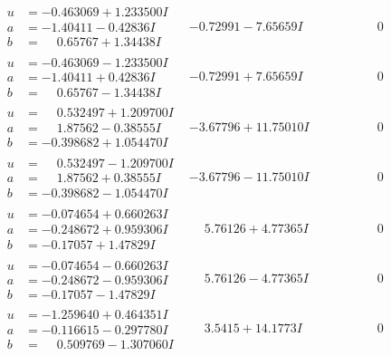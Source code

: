\documentclass[1p]{elsarticle_modified}
\theoremstyle{definition}
\begin{document}
$$\begin{array}{c|c|c}
\begin{aligned}
u &= -0.463069 + 1.233500 I \\
a &= -1.40411 - 0.42836 I \\
b &= \phantom{-}0.65767 + 1.34438 I\end{aligned}
 & -0.72991 - 7.65659 I & \phantom{-0.000000 } 0 \\ \hline\begin{aligned}
u &= -0.463069 - 1.233500 I \\
a &= -1.40411 + 0.42836 I \\
b &= \phantom{-}0.65767 - 1.34438 I\end{aligned}
 & -0.72991 + 7.65659 I & \phantom{-0.000000 } 0 \\ \hline\begin{aligned}
u &= \phantom{-}0.532497 + 1.209700 I \\
a &= \phantom{-}1.87562 - 0.38555 I \\
b &= -0.398682 + 1.054470 I\end{aligned}
 & -3.67796 + 11.75010 I & \phantom{-0.000000 } 0 \\ \hline\begin{aligned}
u &= \phantom{-}0.532497 - 1.209700 I \\
a &= \phantom{-}1.87562 + 0.38555 I \\
b &= -0.398682 - 1.054470 I\end{aligned}
 & -3.67796 - 11.75010 I & \phantom{-0.000000 } 0 \\ \hline\begin{aligned}
u &= -0.074654 + 0.660263 I \\
a &= -0.248672 + 0.959306 I \\
b &= -0.17057 + 1.47829 I\end{aligned}
 & \phantom{-}5.76126 + 4.77365 I & \phantom{-0.000000 } 0 \\ \hline\begin{aligned}
u &= -0.074654 - 0.660263 I \\
a &= -0.248672 - 0.959306 I \\
b &= -0.17057 - 1.47829 I\end{aligned}
 & \phantom{-}5.76126 - 4.77365 I & \phantom{-0.000000 } 0 \\ \hline\begin{aligned}
u &= -1.259640 + 0.464351 I \\
a &= -0.116615 - 0.297780 I \\
b &= \phantom{-}0.509769 - 1.307060 I\end{aligned}
 & \phantom{-}3.5415 + 14.1773 I & \phantom{-0.000000 } 0 \\ \hline\begin{aligned}

\end{aligned}
\end{array}$$
\end{document}

